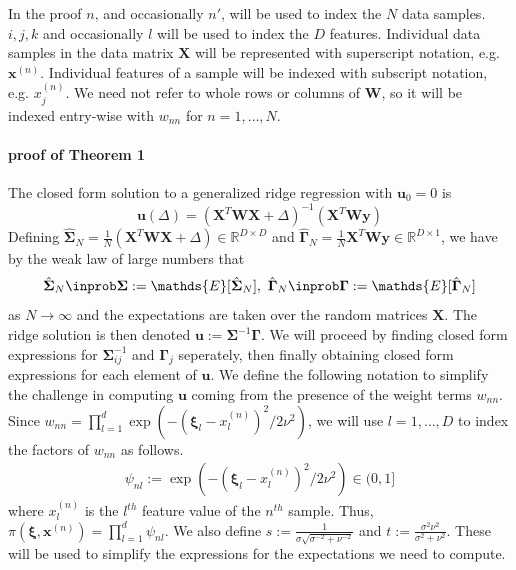         In the proof $n$, and occasionally $n'$, will be used to index the $N$ data samples. $i,j,k$ and occasionally $l$ will be used to index the $D$ features. Individual data samples in the data matrix $\mathbf{X}$ will be represented with superscript notation, e.g. $\mathbf{x}^{(n)}$. Individual features of a sample will be indexed with subscript notation, e.g. $x^{(n)}_j$. We need not refer to whole rows or columns of $\mathbf{W}$, so it will be indexed entry-wise with $w_{nn}$ for $n=1,\ldots, N$.
    

\paragraph{proof of Theorem 1}
        The closed form solution to a generalized ridge regression with $\mathbf{u}_0 = 0$ is
        \begin{equation*}
            \mathbf{u}(\Delta) = (\mathbf{X}^T \mathbf{W} \mathbf{X} + \Delta)^{-1}(\mathbf{X}^T\mathbf{W}\mathbf{y})%
        \end{equation*}
            Defining $\hat{\mathbf{\Sigma}}_N = \frac{1}{N}(\mathbf{X}^T \mathbf{W} \mathbf{X} + \Delta) \in \mathbb{R}^{D\times D}$ and $\hat{\mathbf{\Gamma}}_N = \frac{1}{N}\mathbf{X}^T \mathbf{W}\mathbf{y}\in \mathbb{R}^{D \times 1}$, we have by the weak law of large numbers that 
            \begin{equation*}
                \hat{\mathbf{\Sigma}}_N \inprob \mathbf{\Sigma} := \mathds{E}[\hat{\mathbf{\Sigma}}_N],\ \hat{\mathbf{\Gamma}}_N \inprob \mathbf{\Gamma} := \mathds{E}[\hat{\mathbf{\Gamma}}_N] 
            \end{equation*}
            as $N\rightarrow \infty$ and the expectations are taken over the random matrices $\mathbf{X}$. 
            The ridge solution is then denoted $\mathbf{u} := \mathbf{\Sigma}^{-1}\mathbf{\Gamma}$. We will proceed by finding closed form expressions for $\mathbf{\Sigma}_{ij}^{-1}$ and $\mathbf{\Gamma}_j$ seperately, then finally obtaining closed form expressions for each element of $\mathbf{u}$. We define the following notation to simplify the challenge in computing $\mathbf{u}$ coming from the presence of the weight terms $w_{nn}$. Since $w_{nn}=\prod_{l=1}^d \exp(-(\mathbf{\xi}_l - x^{(n)}_l)^2/2\nu^2)$, we will use $l=1,\ldots,D$ to index the factors of $w_{nn}$ as follows.
            \begin{gather*}
                \psi_{nl} := \exp(-(\mathbf{\xi}_l - x^{(n)}_l)^2/2\nu^2) \in (0,1]
            \end{gather*}
            where $x^{(n)}_l$ is the $l^{th}$ feature value of the $n^{th}$ sample. 
            Thus, $\pi(\mathbf{\xi},\mathbf{x}^{(n)}) = \prod_{l=1}^d \psi_{nl}$. We also define $s:= \frac{1}{\sigma\sqrt{\sigma^{-2} + \nu^{-2}}}$ and $t := \frac{\sigma^2 \nu^2}{\sigma^2 + \nu^2}$. These will be used to simplify the expressions for the expectations we need to compute. 
            
